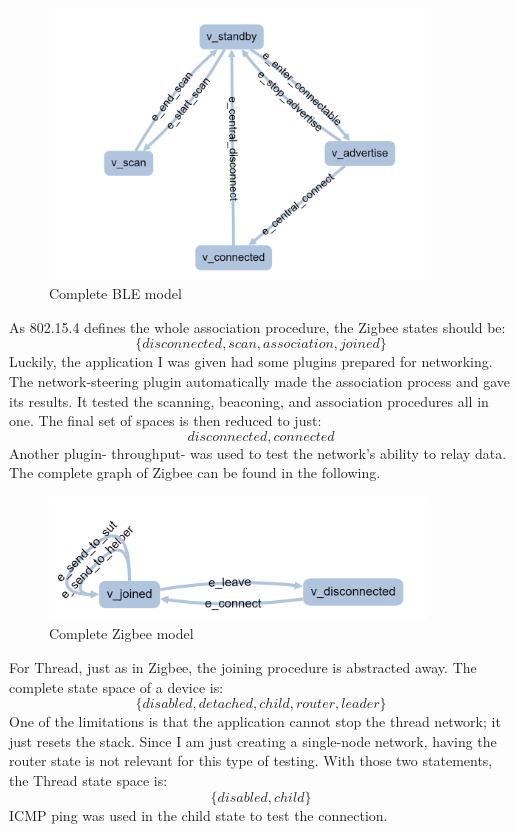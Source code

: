 \begin{figure}
    \includegraphics[width=100mm, keepaspectratio]{figures/model_ble_final.png}
    \caption{Complete BLE model}
\end{figure}

As 802.15.4 defines the whole association procedure, the Zigbee states should be: \[
    \{disconnected, scan, association, joined\}
\] Luckily, the application I was given had some plugins prepared for networking. The network-steering plugin automatically made the association process and gave its results. It tested the scanning, beaconing, and association procedures all in one. The final set of spaces is then reduced to just: \[
    {disconnected, connected}
\] Another plugin- throughput- was used to test the network's ability to relay data. The complete graph of Zigbee can be found in the following.

\begin{figure}
    \includegraphics[width=100mm, keepaspectratio]{figures/model_zigbee_final.png}
    \caption{Complete Zigbee model}
\end{figure}

For Thread, just as in Zigbee, the joining procedure is abstracted away.
The complete state space of a device is: \[
    \{disabled, detached, child, router, leader\}  
\] One of the limitations is that the application cannot stop the thread network; it just resets the stack. Since I am just creating a single-node network, having the router state is not relevant for this type of testing. With those two statements, the Thread state space is: \[
    \{disabled, child\}  
\] ICMP ping was used in the child state to test the connection.

